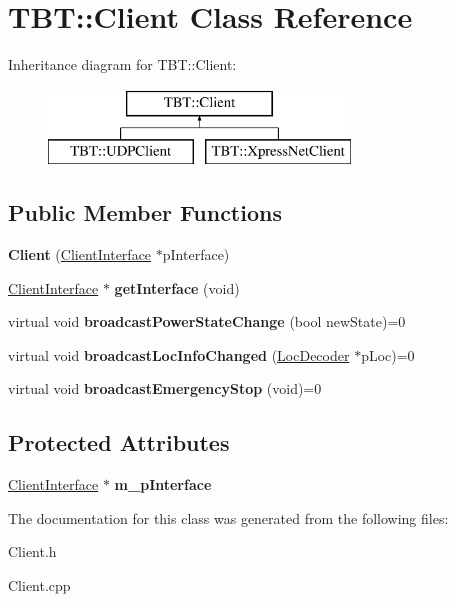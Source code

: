 \hypertarget{classTBT_1_1Client}{}\section{T\+BT\+:\+:Client Class Reference}
\label{classTBT_1_1Client}
Inheritance diagram for T\+BT\+:\+:Client\+:\begin{figure}[H]
\begin{center}
\leavevmode
\includegraphics[height=2.000000cm]{classTBT_1_1Client}
\end{center}
\end{figure}
\subsection*{Public Member Functions}
\begin{DoxyCompactItemize}
\item 
\mbox{\label{classTBT_1_1Client_a6220a6ee1345c62986aea535e2ae202c}} 
{\bfseries Client} (\hyperlink{classTBT_1_1ClientInterface}{Client\+Interface} $\ast$p\+Interface)
\item 
\mbox{\label{classTBT_1_1Client_a37d9a9919aa90879dbf46cf95e519259}} 
\hyperlink{classTBT_1_1ClientInterface}{Client\+Interface} $\ast$ {\bfseries get\+Interface} (void)
\item 
\mbox{\label{classTBT_1_1Client_ad64588b494ec98154ea261ed4f3b3643}} 
virtual void {\bfseries broadcast\+Power\+State\+Change} (bool new\+State)=0
\item 
\mbox{\label{classTBT_1_1Client_aeb3b63a37edc6b95872df54a57c27a71}} 
virtual void {\bfseries broadcast\+Loc\+Info\+Changed} (\hyperlink{classTBT_1_1LocDecoder}{Loc\+Decoder} $\ast$p\+Loc)=0
\item 
\mbox{\label{classTBT_1_1Client_a59459df809a663bcbbb6d31fbfa09402}} 
virtual void {\bfseries broadcast\+Emergency\+Stop} (void)=0
\end{DoxyCompactItemize}
\subsection*{Protected Attributes}
\begin{DoxyCompactItemize}
\item 
\mbox{\label{classTBT_1_1Client_a0b3e41f73f6381600c8ddac129b740f6}} 
\hyperlink{classTBT_1_1ClientInterface}{Client\+Interface} $\ast$ {\bfseries m\+\_\+p\+Interface}
\end{DoxyCompactItemize}


The documentation for this class was generated from the following files\+:\begin{DoxyCompactItemize}
\item 
Client.\+h\item 
Client.\+cpp\end{DoxyCompactItemize}
